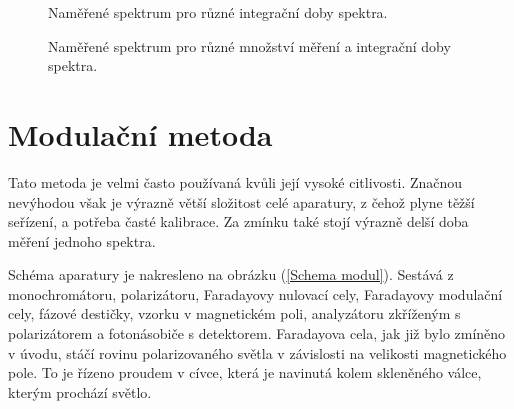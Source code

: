 \begin{figure}

\caption{Naměřené spektrum pro různé integrační doby spektra.}
\label{TPE2}
\end{figure}

\begin{figure}

\caption{Naměřené spektrum pro různé množství měření a integrační doby spektra.}
\label{TPE3}
\end{figure}


\section{Modulační metoda}
Tato metoda je velmi často používaná kvůli její vysoké citlivosti. Značnou nevýhodou však je výrazně větší složitost celé aparatury, z čehož plyne těžší seřízení, a potřeba časté kalibrace. Za zmínku také stojí výrazně delší doba měření jednoho spektra.

Schéma aparatury je nakresleno na obrázku (\ref{Schema modul}). Sestává z monochromátoru, polarizátoru, Faradayovy nulovací cely, Faradayovy modulační cely, fázové destičky, vzorku v magnetickém poli, analyzátoru zkříženým s polarizátorem a fotonásobiče s detektorem. 
Faradayova cela, jak již bylo zmíněno v úvodu, stáčí rovinu polarizovaného světla v závislosti na velikosti magnetického pole. To je řízeno proudem v cívce, která je navinutá kolem skleněného válce, kterým prochází světlo.

